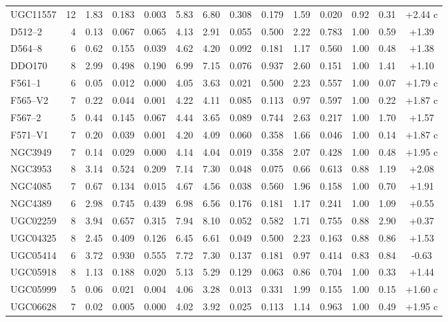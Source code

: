 \documentclass[10pt]{article}
\begin{document}
\begin{landscape}
{\begin{longtable}{lrrrrrrrrrrrrc}
UGC11557 & 12 & 1.83 & 0.183 & 0.003 & 5.83 & 6.80 & 0.308 & 0.179 & 1.59 & 0.020 & 0.92 & 0.31 & +2.44 c\\
D512--2 & 4 & 0.13 & 0.067 & 0.065 & 4.13 & 2.91 & 0.055 & 0.500 & 2.22 & 0.783 & 1.00 & 0.59 & +1.39 \\
D564--8 & 6 & 0.62 & 0.155 & 0.039 & 4.62 & 4.20 & 0.092 & 0.181 & 1.17 & 0.560 & 1.00 & 0.48 & +1.38 \\
DDO170 & 8 & 2.99 & 0.498 & 0.190 & 6.99 & 7.15 & 0.076 & 0.937 & 2.60 & 0.151 & 1.00 & 1.41 & +1.10 \\
F561--1 & 6 & 0.05 & 0.012 & 0.000 & 4.05 & 3.63 & 0.021 & 0.500 & 2.23 & 0.557 & 1.00 & 0.07 & +1.79 c\\
F565--V2 & 7 & 0.22 & 0.044 & 0.001 & 4.22 & 4.11 & 0.085 & 0.113 & 0.97 & 0.597 & 1.00 & 0.22 & +1.87 c\\
F567--2 & 5 & 0.44 & 0.145 & 0.067 & 4.44 & 3.65 & 0.089 & 0.744 & 2.63 & 0.217 & 1.00 & 1.70 & +1.57 \\
F571--V1 & 7 & 0.20 & 0.039 & 0.001 & 4.20 & 4.09 & 0.060 & 0.358 & 1.66 & 0.046 & 1.00 & 0.14 & +1.87 c\\
NGC3949 & 7 & 0.14 & 0.029 & 0.000 & 4.14 & 4.04 & 0.019 & 0.358 & 2.07 & 0.428 & 1.00 & 0.48 & +1.95 c\\
NGC3953 & 8 & 3.14 & 0.524 & 0.209 & 7.14 & 7.30 & 0.048 & 0.075 & 0.66 & 0.613 & 0.88 & 1.19 & +2.08 \\
NGC4085 & 7 & 0.67 & 0.134 & 0.015 & 4.67 & 4.56 & 0.038 & 0.560 & 1.96 & 0.158 & 1.00 & 0.70 & +1.91 \\
NGC4389 & 6 & 2.98 & 0.745 & 0.439 & 6.98 & 6.56 & 0.176 & 0.181 & 1.17 & 0.241 & 1.00 & 1.09 & +0.55 \\
UGC02259 & 8 & 3.94 & 0.657 & 0.315 & 7.94 & 8.10 & 0.052 & 0.582 & 1.71 & 0.755 & 0.88 & 2.90 & +0.37 \\
UGC04325 & 8 & 2.45 & 0.409 & 0.126 & 6.45 & 6.61 & 0.049 & 0.500 & 2.23 & 0.163 & 0.88 & 0.86 & +1.53 \\
UGC05414 & 6 & 3.72 & 0.930 & 0.555 & 7.72 & 7.30 & 0.137 & 0.181 & 0.97 & 0.414 & 0.83 & 0.84 & -0.63 \\
UGC05918 & 8 & 1.13 & 0.188 & 0.020 & 5.13 & 5.29 & 0.129 & 0.063 & 0.86 & 0.704 & 1.00 & 0.33 & +1.44 \\
UGC05999 & 5 & 0.06 & 0.021 & 0.004 & 4.06 & 3.28 & 0.013 & 0.331 & 1.99 & 0.155 & 1.00 & 0.15 & +1.60 c\\
UGC06628 & 7 & 0.02 & 0.005 & 0.000 & 4.02 & 3.92 & 0.025 & 0.113 & 1.14 & 0.963 & 1.00 & 0.49 & +1.95 c\\

\end{longtable}}
\end{landscape}
\end{document}
